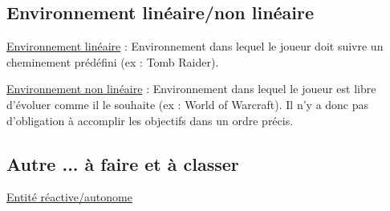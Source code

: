 \subsection*{Environnement linéaire/non linéaire}

\underline{Environnement linéaire} : 
Environnement dans lequel le joueur doit suivre un cheminement prédéfini (ex : Tomb Raider).

\underline{Environnement non linéaire} : 
Environnement dans lequel le joueur est libre d'évoluer comme il le souhaite (ex : World of Warcraft). 
Il n'y a donc pas d'obligation à accomplir les objectifs dans un ordre précis.


\subsection*{Autre ... à faire et à classer}


\underline{Entité réactive/autonome}

